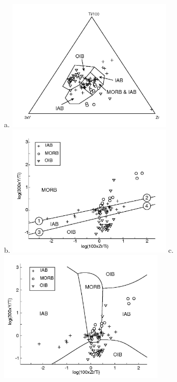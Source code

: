 \begin{figure}[htbp]
  \centering
a.  \includegraphics[width=300]{figures/PearceTiZrY.jpg}\\
b.  \includegraphics[width=300]{figures/log_Ti_Zr_Y_lin.jpg}
c.  \includegraphics[width=300]{figures/log_Ti_Zr_Y_q.jpg}

\end{figure}
